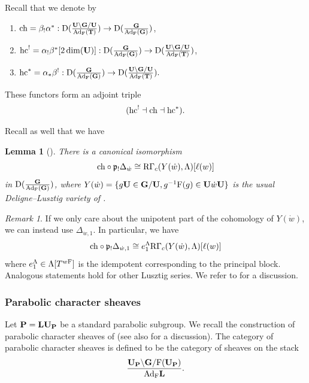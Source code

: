\documentclass[article, 10pt, oneside, reqno]{amsart}
\theoremstyle{plain}
\newtheorem{lem}[thm]{Lemma}
\theoremstyle{definition}
\theoremstyle{remark}
\newtheorem{rque}[thm]{Remark}
\begin{document}
Recall that we denote by 
\begin{enumerate}
\item $\mathrm{ch} = \beta_!\alpha^* : \mathrm{D}(\frac{\mathbf{U} \backslash \mathbf{G} /\mathbf{U}}{\mathrm{Ad}_{\mathrm{F}}(\mathbf{T})}) \to \mathrm{D}(\frac{\mathbf{G}}{\mathrm{Ad}_{\mathrm{F}}(\mathbf{G})})$, 
\item $\mathrm{hc}^! = \alpha_!\beta^*[2\dim(\mathbf{U})] : \mathrm{D}(\frac{\mathbf{G}}{\mathrm{Ad}_{\mathrm{F}}(\mathbf{G})}) \to \mathrm{D}(\frac{\mathbf{U} \backslash \mathbf{G} /\mathbf{U}}{\mathrm{Ad}_{\mathrm{F}}(\mathbf{T})})$, 
\item $\mathrm{hc}^* = \alpha_*\beta^! : \mathrm{D}(\frac{\mathbf{G}}{\mathrm{Ad}_{\mathrm{F}}(\mathbf{G})}) \to \mathrm{D}(\frac{\mathbf{U} \backslash \mathbf{G} /\mathbf{U}}{\mathrm{Ad}_{\mathrm{F}}(\mathbf{T})}).$ 
\end{enumerate}
These functors form an adjoint triple 
$$(\mathrm{hc}^! \dashv \mathrm{ch} \dashv \mathrm{hc}^*).$$

Recall as well that we have 
\begin{lem}[]\label{lem:dl-vs-ch}
There is a canonical isomorphism
$$\mathrm{ch} \circ \mathfrak{p}_!\Delta_{\dot{w}} \cong \mathrm{R\Gamma}_c(Y(\dot{w}), \Lambda)[\ell(w)]$$
in $\mathrm{D}(\frac{\mathbf{G}}{\mathrm{Ad}_{\mathrm{F}}(\mathbf{G})})$, where $Y(\dot{w}) = \{g\mathbf{U} \in \mathbf{G}/\mathbf{U}, g^{-1}\mathrm{F}(g) \in \mathbf{U} \dot{w}\mathbf{U}\}$ is the usual Deligne--Lusztig variety of \cite{DeligneLusztig}.
\end{lem}

\begin{rque}\label{rque:series}
If we only care about the unipotent part of the cohomology of $Y(\dot{w})$, we can instead use $\Delta_{\dot{w},1}$. In particular, we have 
$$\mathrm{ch} \circ \mathfrak{p}_!\Delta_{\dot{w},1} \cong e_1^{\Lambda}\mathrm{R\Gamma}_c(Y(\dot{w}), \Lambda)[\ell(w)]$$
where $e_1^{\Lambda} \in \Lambda[T^{w\mathrm{F}}]$ is the idempotent corresponding to the principal block. Analogous statements hold for other Lusztig series. We refer to \cite[Section 5.3]{EteveJordan} for a discussion.
\end{rque}

\subsubsection{Parabolic character sheaves}

Let $\mathbf{P} = \mathbf{L}\mathbf{U}_{\mathbf{P}}$ be a standard parabolic subgroup. We recall the construction of parabolic character sheaves of \cite{LusztigParabolicCS1} (see also \cite[Section 4]{EteveJordan} for a discussion). The category of parabolic character sheaves is defined to be the category of sheaves on the stack 
$$\frac{\mathbf{U}_{\mathbf{P}} \backslash \mathbf{G}/\mathrm{F}(\mathbf{U}_{\mathbf{P}})}{\mathrm{Ad}_{\mathrm{F}}\mathbf{L}}.$$
\end{document}
